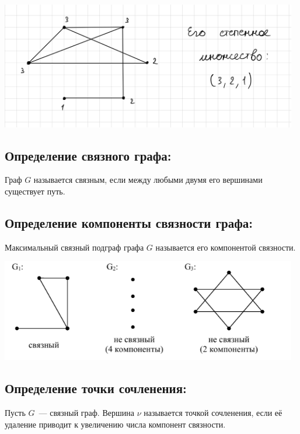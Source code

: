 \documentclass[14pt]{extarticle}
\begin{document}
\begin{center}
    \includegraphics[width=130mm]{"3.8.1.png"}
\end{center}

\subsection{Определение связного графа:}

Граф $G$ называется связным, если 
между любыми двумя его вершинами существует путь.

\subsection{Определение компоненты связности графа:}

Максимальный связный подграф графа $G$ называется его компонентой 
связности.

\begin{center}
    \includegraphics[width=130mm]{"3.10.1.png"}
\end{center}

\subsection{Определение точки сочленения:}

Пусть $G$~--- связный граф. Вершина $\nu$ называется точкой сочленения,
если её удаление приводит к увеличению числа компонент связности.
\end{document}
